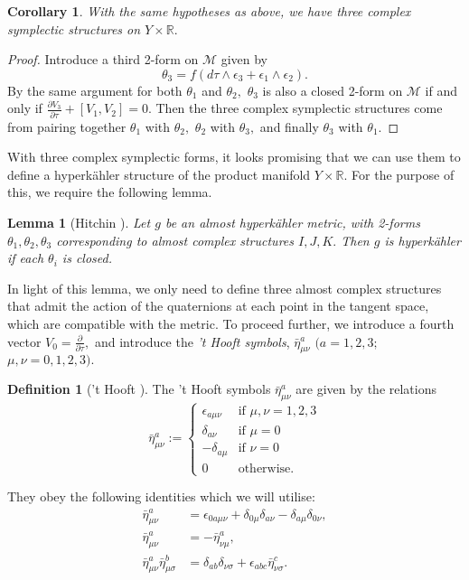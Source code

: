 \documentclass[a4paper,onecolumn,12pt]{article}
\newtheorem{lem}[thm]{Lemma}
\newtheorem{cor}[thm]{Corollary}
\theoremstyle{definition}
\newtheorem{defn}[thm]{Definition}
\theoremstyle{remark}
\newcommand{\m}{\mu}
\newcommand{\n}{\nu}
\newcommand{\e}{\epsilon}
\newcommand{\tta}[1]{\theta_{#1}}
\newcommand{\ddt}[1]{\frac{\partial #1}{\partial \tau}}
\newcommand{\dd}[2]{\frac{\partial #1}{\partial #2}}
\newcommand{\HK}{hyperk\"ahler }
\newcommand{\R}{\mathbb{R}}
\newcommand{\hooft}[3]{\bar{\eta}^{#1}_{#2 #3}}
\begin{document}
\begin{cor}
	With the same hypotheses as above, we have three complex symplectic structures on $Y\times\R.$
\end{cor}
\begin{proof}
	Introduce a third 2-form on $\mathcal{M}$ given by
	\begin{equation*}
	\theta_{3} = f(d\tau \wedge \e_{3} +  \e_{1}\wedge \e_{2}).
	\end{equation*}
	By the same argument for both $\theta_{1}$ and $\theta_{2},$ $\theta_{3}$ is also a closed 2-form on $\mathcal{M}$ if and only if $\dd{V_{3}}{\tau} + [V_{1},V_{2}] = 0.$ Then the three complex symplectic structures come from pairing together $\theta_{1}$ with $\theta_{2},$ $\theta_{2}$ with $\theta_{3},$ and finally $\theta_{3}$ with $\theta_{1}.$
\end{proof}
With three complex symplectic forms, it looks promising that we can use them to define a \HK structure of the product manifold $Y\times\R.$ For the purpose of this, we require the following lemma.\\
\begin{lem}[Hitchin \cite{Hitchin_1987}]
	\label{hitchin_lemma}
	Let $g$ be an almost \HK metric, with 2-forms $\tta{1},\tta{2},\tta{3}$ corresponding to almost complex structures $I,J,K.$ Then $g$ is \HK if each $\tta{i}$ is closed.
\end{lem}
In light of this lemma, we only need to define three almost complex structures that admit the action of the quaternions at each point in the tangent space, which are compatible with the metric. To proceed further, we introduce a fourth vector $V_{0} = \ddt{},$ and introduce the \emph{'t Hooft symbols}, $\hooft{a}{\m}{\n}$ $(a=1,2,3;$ $\m,\n = 0,1,2,3).$\\
\begin{defn}['t Hooft \cite{thooft_1976}]
	The 't Hooft symbols $\hooft{a}{\m}{\n}$ are given by the relations
	\[
	\bar{\eta}^{a}_{\mu \nu}:= 
	\begin{cases}
	\epsilon_{a\mu\nu}& \text{if } \mu,\nu = 1,2,3\\
	\delta_{a\nu}& \text{if } \mu = 0\\
	-\delta_{a\mu}& \text{if } \nu = 0\\
	0& \text{otherwise.}
	\end{cases}
	\]
\end{defn}
They obey the following identities which we will utilise:
\begin{subequations}
	\begin{align}
	\label{thooft}
	\bar{\eta}^{a}_{\mu \nu} &= \epsilon_{0 a\mu\nu} + \delta_{0\mu}\delta_{a\nu} - \delta_{a\mu}\delta_{0\nu},\\
	\bar{\eta}^{a}_{\mu \nu} &= -\bar{\eta}^{a}_{\nu \mu},\\
	\bar{\eta}^{a}_{\mu \nu}\bar{\eta}^{b}_{\mu \sigma} &= \delta_{ab}\delta_{\nu\sigma} + \epsilon_{abc}\bar{\eta}^{c}_{\nu \sigma}.
	\end{align}
\end{subequations}
\end{document}

